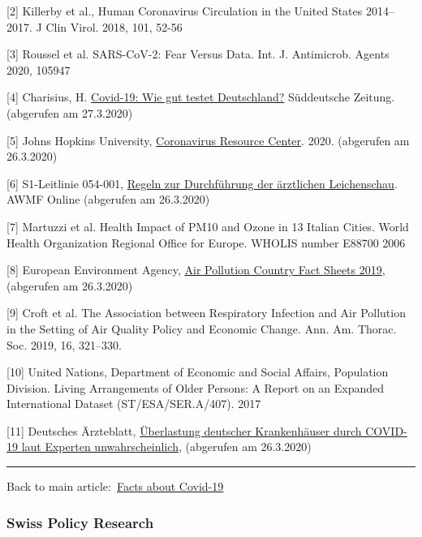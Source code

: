 {[}2{]} Killerby et al., Human Coronavirus Circulation in the United
States 2014--2017. J Clin Virol. 2018, 101, 52-56

{[}3{]} Roussel et al. SARS-CoV-2: Fear Versus Data. Int. J. Antimicrob.
Agents 2020, 105947

{[}4{]} Charisius, H.
\href{https://www.sueddeutsche.de/gesundheit/covid-19-coronavirus-testverfahren-1.4855487}{Covid-19:
Wie gut testet Deutschland?} Süddeutsche Zeitung. (abgerufen am
27.3.2020)

{[}5{]} Johns Hopkins University,
\href{https://coronavirus.jhu.edu/map.html}{Coronavirus Resource
Center}. 2020. (abgerufen am 26.3.2020)

{[}6{]} S1-Leitlinie 054-001,
\href{https://www.awmf.org/uploads/tx_szleitlinien/054-002l_S1_Regeln-zur-Durchfuehrung-der-aerztlichen-Leichenschau_2018-02_01.pdf}{Regeln
zur Durchführung der ärztlichen Leichenschau}. AWMF Online (abgerufen am
26.3.2020)

{[}7{]} Martuzzi et al. Health Impact of PM10 and Ozone in 13 Italian
Cities. World Health Organization Regional Office for Europe. WHOLIS
number E88700 2006

{[}8{]} European Environment Agency,
\href{https://www.eea.europa.eu/themes/air/country-fact-sheets/2019-country-fact-sheets}{Air
Pollution Country Fact Sheets 2019}, (abgerufen am 26.3.2020)

{[}9{]} Croft et al. The Association between Respiratory Infection and
Air Pollution in the Setting of Air Quality Policy and Economic Change.
Ann. Am. Thorac. Soc. 2019, 16, 321--330.

{[}10{]} United Nations, Department of Economic and Social Affairs,
Population Division. Living Arrange­ments of Older Persons: A Report on
an Expanded International Dataset (ST/ESA/SER.A/407). 2017

{[}11{]} Deutsches Ärzteblatt,
\href{https://www.aerzteblatt.de/nachrichten/111029/Ueberlastung-deutscher-Krankenhaeuser-durch-COVID-19-laut-Experten-unwahrscheinlich}{Überlastung
deutscher Krankenhäuser durch COVID-19 laut Experten unwahrscheinlich},
(abgerufen am 26.3.2020)

\begin{center}\rule{0.5\linewidth}{\linethickness}\end{center}

Back to main
article:~\href{https://swprs.org/a-swiss-doctor-on-covid-19/}{Facts
about Covid-19}

\hypertarget{swiss-policy-research}{%
\subsubsection{Swiss Policy Research}\label{swiss-policy-research}}

